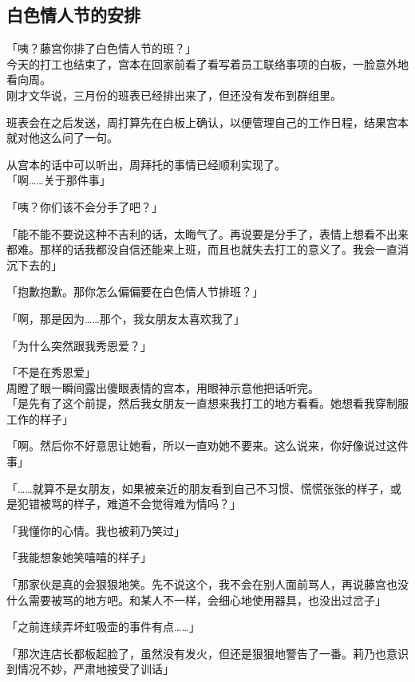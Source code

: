 \subsection{白色情人节的安排}

「咦？藤宫你排了白色情人节的班？」\\

今天的打工也结束了，宫本在回家前看了看写着员工联络事项的白板，一脸意外地看向周。\\

刚才文华说，三月份的班表已经排出来了，但还没有发布到群组里。

班表会在之后发送，周打算先在白板上确认，以便管理自己的工作日程，结果宫本就对他这么问了一句。

从宫本的话中可以听出，周拜托的事情已经顺利实现了。\\

「啊……关于那件事」

「咦？你们该不会分手了吧？」

「能不能不要说这种不吉利的话，太晦气了。再说要是分手了，表情上想看不出来都难。那样的话我都没自信还能来上班，而且也就失去打工的意义了。我会一直消沉下去的」

「抱歉抱歉。那你怎么偏偏要在白色情人节排班？」

「啊，那是因为……那个，我女朋友太喜欢我了」

「为什么突然跟我秀恩爱？」

「不是在秀恩爱」\\

周瞪了眼一瞬间露出傻眼表情的宫本，用眼神示意他把话听完。\\

「是先有了这个前提，然后我女朋友一直想来我打工的地方看看。她想看我穿制服工作的样子」

「啊。然后你不好意思让她看，所以一直劝她不要来。这么说来，你好像说过这件事」

「……就算不是女朋友，如果被亲近的朋友看到自己不习惯、慌慌张张的样子，或是犯错被骂的样子，难道不会觉得难为情吗？」

「我懂你的心情。我也被莉乃笑过」

「我能想象她笑嘻嘻的样子」

「那家伙是真的会狠狠地笑。先不说这个，我不会在别人面前骂人，再说藤宫也没什么需要被骂的地方吧。和某人不一样，会细心地使用器具，也没出过岔子」

「之前连续弄坏虹吸壶的事件有点……」

「那次连店长都板起脸了，虽然没有发火，但还是狠狠地警告了一番。莉乃也意识到情况不妙，严肃地接受了训话」\\

